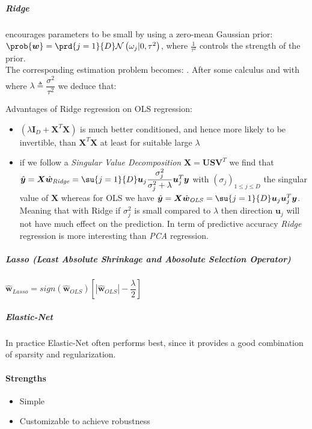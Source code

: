 \subparagraph{Ridge}
encourages parameters to be small by using a zero-mean Gaussian prior: $\prob{\bm{w}} = 
\prd{j=1}{D} \mathcal{N}\left(\omega_{j}|0, \tau^{2}\right)$, where $\frac{1}{\tau^{2}}$
controls the strength of the prior.\\
The corresponding  estimation problem becomes:
. After some calculus and with where $\lambda \triangleq 
\dfrac{\sigma^{2}}{\tau^{2}}$ we deduce that:
\begin{center}
\end{center}
Advantages of Ridge regression on OLS regression:
\begin{itemize}
    \item $\left(\lambda\bm{I}_{D}+\bm{X}^{T}\bm{X}\right)$ is much better conditioned, 
        and hence more likely to be invertible, than $\bm{X}^{T}\bm{X}$ at least for 
        suitable large $\lambda$
    \item if we follow a \emph{Singular Value Decomposition} $\bm{X} = \bm{U}\bm{S}
        \bm{V}^{T}$ we find 
        that $\hat{\bm{y}} = \bm{X}\hat{\bm{w}}_{\text{\emph{Ridge}}} = \su{j=1}{D}
        \bm{u}_{j}\dfrac{\sigma_{j}^{2}}{\sigma_{j}^{2} + \lambda}\bm{u}_{j}^{T}\bm{y}$
        with $\left(\sigma_{j}\right)_{1\leq j \leq D}$ the singular value of $\bm{X}$
        whereas for OLS we have $\hat{\bm{y}} = \bm{X}\hat{\bm{w}}_{\text{\emph{OLS}}} 
        = \su{j=1}{D} \bm{u}_{j}\bm{u}_{j}^{T}\bm{y}$. Meaning that with Ridge if 
        $\sigma_{j}^{2}$ is small compared to $\lambda$ then direction $\bm{u}_{j}$
        will not have much effect on the prediction. In term of predictive accuracy
        \emph{Ridge} regression is more interesting than \emph{PCA} regression.
\end{itemize}
\subparagraph{Lasso (Least Absolute Shrinkage and Abosolute Selection Operator)}
$\hat{\bm{w}}_{Lasso} = sign(\hat{\bm{w}}_{OLS})\left[|\hat{\bm{w}}_{OLS}| -\dfrac{
\lambda}{2}\right] $

\subparagraph{Elastic-Net}
In practice Elastic-Net often performs best, since it provides a good combination of
sparsity and regularization.
\paragraph{Strengths}
\begin{itemize}
    \item Simple
    \item Customizable to achieve robustness
\end{itemize}

